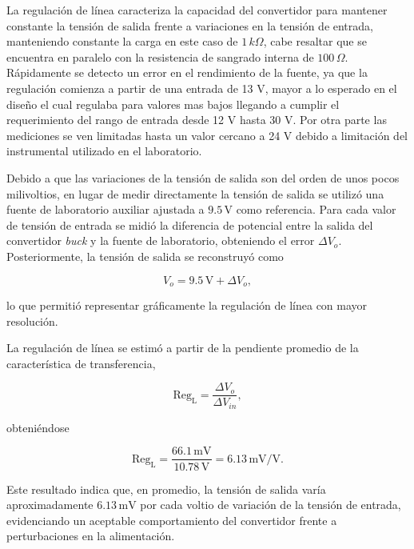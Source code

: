 \documentclass[]{article}
\begin{document}
	La regulación de línea caracteriza la capacidad del convertidor para mantener constante la tensión de salida frente a variaciones en la tensión de entrada, manteniendo constante la carga en este caso de $1 \, k\Omega$, cabe resaltar que se encuentra en paralelo con la resistencia de sangrado interna de $100\, \Omega$. Rápidamente se detecto un error en el rendimiento de la fuente, ya que la regulación comienza a partir de una entrada de 13 V, mayor a lo esperado en el diseño el cual regulaba para valores mas bajos llegando a cumplir el requerimiento del rango de entrada desde 12 V hasta 30 V. Por otra parte las mediciones se ven limitadas hasta un valor cercano a 24 V debido a limitación del instrumental utilizado en el laboratorio.
	
	
	
	Debido a que las variaciones de la tensión de salida son del orden de unos pocos milivoltios, en lugar de medir directamente la tensión de salida se utilizó una fuente de laboratorio auxiliar ajustada a $9.5\,\mathrm{V}$ como referencia. Para cada valor de tensión de entrada se midió la diferencia de potencial entre la salida del convertidor \textit{buck} y la fuente de laboratorio, obteniendo el error $\Delta V_o$. Posteriormente, la tensión de salida se reconstruyó como
	
	\[
	V_o = 9.5\,\mathrm{V} + \Delta V_o,
	\]
	
	lo que permitió representar gráficamente la regulación de línea con mayor resolución.
	
	La regulación de línea se estimó a partir de la pendiente promedio de la característica de transferencia,
	
	\[
	\mathrm{Reg}_{\mathrm{L}}=
	\frac{\Delta V_o}{\Delta V_{in}},
	\]
	
	obteniéndose
	
	\[
	\mathrm{Reg}_{\mathrm{L}}
	=
	\frac{66.1\,\mathrm{mV}}{10.78\,\mathrm{V}}
	=
	6.13\,\mathrm{mV/V}.
	\]
	
	Este resultado indica que, en promedio, la tensión de salida varía aproximadamente $6.13\,\mathrm{mV}$ por cada voltio de variación de la tensión de entrada, evidenciando un aceptable comportamiento del convertidor frente a perturbaciones en la alimentación.
	
\end{document}
